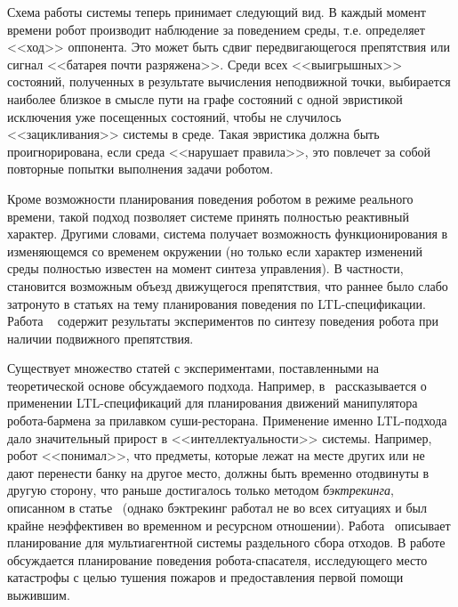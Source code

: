 \documentclass[a4, 14pt]{article}
\begin{document}
Схема работы системы теперь принимает следующий вид. В каждый момент времени 
робот производит наблюдение за поведением среды, т.е. определяет <<ход>> 
оппонента. Это может быть сдвиг передвигающегося препятствия или сигнал <<батарея 
почти разряжена>>. Среди всех <<выигрышных>> состояний, полученных в результате 
вычисления неподвижной точки, выбирается наиболее близкое в смысле пути на графе 
состояний с одной эвристикой исключения уже посещенных состояний, чтобы не 
случилось <<зацикливания>> системы в среде. Такая эвристика должна быть 
проигнорирована, если среда <<нарушает правила>>, это повлечет за собой повторные 
попытки выполнения задачи роботом.

Кроме возможности планирования поведения роботом в режиме реального времени, 
такой подход позволяет системе принять полностью реактивный характер. 
Другими словами, система получает возможность функционирования в изменяющемся со временем окружении 
(но только если характер изменений среды полностью известен на момент синтеза управления).
В частности, становится возможным объезд движущегося препятствия, что раннее было 
слабо затронуто в статьях на тему планирования поведения по LTL-спецификации. 
Работа ~\cite{piterman2006synthesis} содержит результаты экспериментов по 
синтезу поведения робота при наличии подвижного препятствия.

Существует множество статей с экспериментами, поставленными на теоретической 
основе обсуждаемого подхода. Например, в~\cite{he2015towards} рассказывается 
о применении LTL-спецификаций для планирования движений манипулятора 
робота-бармена за прилавком суши-ресторана. Применение именно LTL-подхода 
дало значительный прирост в <<интеллектуальности>> системы. Например, робот 
<<понимал>>, что предметы, которые лежат на месте других или не дают перенести 
банку на другое место, должны быть временно отодвинуты в другую сторону, что 
раньше достигалось только методом \textit{бэктрекинга}, описанном в статье~\cite{srivastava2014combined}
(однако бэктрекинг работал не во всех ситуациях и был крайне неэффективен во 
временном и ресурсном отношении). Работа~\cite{raman2014synthesis} описывает 
планирование для мультиагентной системы раздельного сбора отходов. В 
работе~\cite{vasile2014reactive} обсуждается планирование поведения робота-спасателя, 
исследующего место катастрофы с целью тушения пожаров и предоставления первой 
помощи выжившим.
\end{document}
